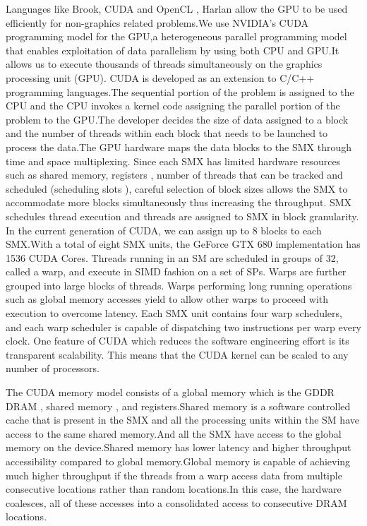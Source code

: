 \documentclass{article}
\begin{document}
Languages like Brook, CUDA and OpenCL , Harlan allow the GPU to be used efficiently for non-graphics related problems.We use NVIDIA's CUDA programming model for the GPU,a heterogeneous parallel  programming model that enables exploitation of data parallelism by using both CPU and GPU.It allows us to execute thousands of threads simultaneously on the graphics processing unit (GPU). 
CUDA is developed as an extension to C/C++ programming languages.The sequential portion of the problem is assigned to the CPU and the CPU invokes a kernel code assigning the parallel portion of the problem to the GPU.The developer decides the size of data assigned to a block and the number of threads within each block that needs to be launched to process the data.The GPU hardware maps the data blocks to the SMX through time and space multiplexing.
Since each SMX has limited hardware resources such as shared memory, registers , number of threads that can be tracked and scheduled (scheduling slots ), careful selection of block sizes allows the SMX to accommodate more blocks simultaneously thus increasing the throughput.
SMX schedules thread execution and threads are assigned to SMX in block granularity. In the current generation of CUDA, we can assign up to 8 blocks to each SMX.With a total of eight SMX units, the GeForce GTX 680 implementation has 1536 CUDA Cores.
Threads running in an SM are scheduled in groups of 32, called a warp, and execute in SIMD fashion on a set of SPs. Warps are further grouped into large blocks of threads. Warps performing long running operations such as global memory accesses yield to allow other warps to proceed with execution to overcome latency.
Each SMX unit contains four warp schedulers, and each warp scheduler is capable of dispatching two instructions per warp every clock.
One feature of CUDA which reduces the software engineering effort is its transparent scalability. This means that the CUDA  kernel can be scaled to any number of processors.

The CUDA memory model consists of a global memory which is the GDDR DRAM , shared memory , and registers.Shared memory is a software controlled cache that is present in the SMX and all the processing units within the SM have access to the same shared memory.And all the SMX have access to the global memory on the device.Shared memory has lower latency and higher throughput accessibility compared to global memory.Global memory is capable of achieving much higher throughput if the threads from a warp access data from multiple consecutive locations rather than random locations.In this case, the hardware coalesces, all of these accesses into a consolidated access to consecutive DRAM locations.
\end{document}
